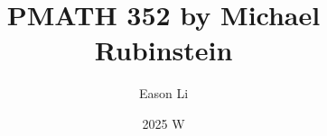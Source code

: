 \documentclass{article}
\begin{document}
\title{PMATH 352 by Michael Rubinstein}
\author{Eason Li}
\date{2025 W}
\maketitle
\end{document}
